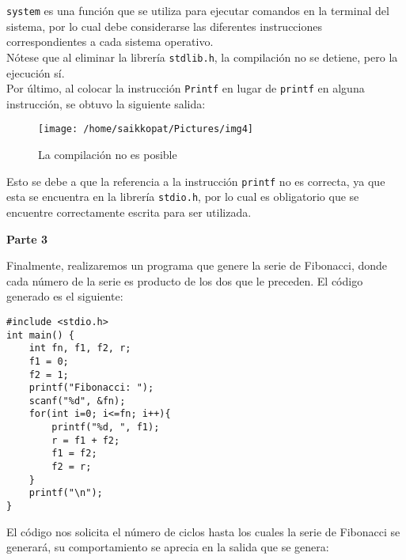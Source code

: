 \documentclass[a4paper,12pt]{report}
\begin{document}
\verb+system+ es una función que se utiliza para ejecutar comandos en la terminal del sistema, por lo cual debe considerarse las diferentes instrucciones correspondientes a cada sistema operativo.\\
Nótese que al eliminar la librería \verb+stdlib.h+, la compilación no se detiene, pero la ejecución sí.\\

Por último, al colocar la instrucción \verb+Printf+ en lugar de \verb+printf+ en alguna instrucción, se obtuvo la siguiente salida:\\

\vspace{0.5cm}

\begin{figure}[htp]
	\texttt{[image: /home/saikkopat/Pictures/img4]}
	\caption{La compilación no es posible}
\end{figure}

\vspace{0.5cm}

Esto se debe a que la referencia a la instrucción \verb+printf+ no es correcta, ya que esta se encuentra en la librería \verb+stdio.h+, por lo cual es obligatorio que se encuentre correctamente escrita para ser utilizada.\\

\newpage

\textbf{Parte 3}\\

\vspace{0.3cm}

Finalmente, realizaremos un programa que genere la serie de Fibonacci, donde cada número de la serie es producto de los dos que le preceden. El código generado es el siguiente:\\

\vspace{0.3cm}

\begin{lstlisting}
#include <stdio.h>
int main() {
	int fn, f1, f2, r;
	f1 = 0;
	f2 = 1;
	printf("Fibonacci: ");
	scanf("%d", &fn);
	for(int i=0; i<=fn; i++){
		printf("%d, ", f1);
		r = f1 + f2;
		f1 = f2;
		f2 = r;
	}
	printf("\n");
}	
\end{lstlisting}

\vspace{0.2cm}

El código nos solicita el número de ciclos hasta los cuales la serie de Fibonacci se generará, su comportamiento se aprecia en la salida que se genera:
\end{document}
